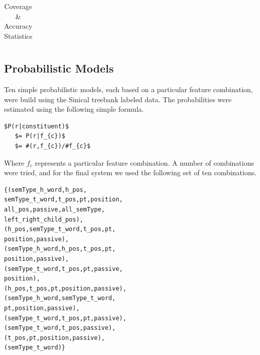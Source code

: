 \documentclass[11pt]{article}
\begin{document}
\begin{table}[!h]
\begin{center}
\begin{tabular}{|l|l|l|l|l|}
\end{tabular}
\caption{Coverage \& Accuracy Statistics}
\end{center}
\end{table}
\normalsize
\subsection{Probabilistic Models}
Ten simple probabilistic models, each based on a particular feature combination, were build using the Sinical treebank labeled data. The probabilities were estimated using the following simple formula. 
\begin{Verbatim}[commandchars=\\\{\},codes={\catcode`$=3\catcode`_=8}]
  $P(r|constituent)$  
   $= P(r|f_{c})$
   $= #(r,f_{c})/#f_{c}$
\end{Verbatim} 
Where $f_c$ represents a particular feature combination. A number of combinations were tried, and for the final system we used the following set of ten combinations.
\begin{verbatim}
{(semType_h_word,h_pos,
semType_t_word,t_pos,pt,position,
all_pos,passive,all_semType,
left_right_child_pos), 
(h_pos,semType_t_word,t_pos,pt,
position,passive),
(semType_h_word,h_pos,t_pos,pt,
position,passive),
(semType_t_word,t_pos,pt,passive,
position),
(h_pos,t_pos,pt,position,passive),
(semType_h_word,semType_t_word,
pt,position,passive),
(semType_t_word,t_pos,pt,passive),
(semType_t_word,t_pos,passive),
(t_pos,pt,position,passive),
(semType_t_word)}
\end{verbatim}
\end{document}

